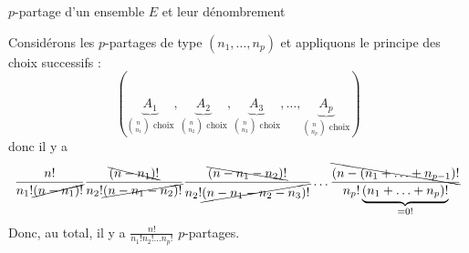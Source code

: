 \documentclass{article}
\renewenvironment{question_kholle}[2][ ]
{
	\subsection{\texorpdfstring{#2}{}}
	\notblank{#1}
	{
		\noindent #1
		\bigbreak
	}
	{}
	\begin{proof}
}
{
	\end{proof}
}
\begin{document}
\begin{question_kholle}
  [Soit $p \in \N^*$. Un $p$-partage de $E$ est un $p$-liste $(A_1, \ldots, A_p) \in \mathcal{P}(E)^p$ de parties de $E$ (éventuellement vide), deux à deux disjointes qui recouvrent $E$ c'est-à-dire \tq+* t:
    \begin{equation}
      \forall (i, j) \in \lient 1 ; p \rient,
      i \neq j \implies A_i \cap A_j = \emptyset
      \qquad \text{et} \qquad
      \bigcup_{i=1}^{p} A_i = E
    \end{equation}

    Soient $(n_1, \ldots n_p) \in \N^p$ \tqs $n = n_1 + \ldots + n_p$ est un $p$-partage de $E$ \tq
    \begin{equation*}
      \forall (i, j) \in \lient 1 ; p \rient, \
      \left|A_i\right| = n_i
    \end{equation*}
    Le nombre de $p$-partage de type $(n_1, \ldots, n_p)$ est :
    \begin{equation}
      \frac{n!}{\displaystyle \prod_{i=1}^{p} n_i !}
    \end{equation}
  ]
  {$p$-partage d'un ensemble $E$ et leur dénombrement}

  Considérons les $p$-partages de type $(n_1, \ldots, n_p)$ et appliquons le principe des choix successifs :
  \begin{equation*}
    \left(
    \underbrace{A_1}_{\binom{n}{n_1} \text{ choix}},
    \underbrace{A_2}_{\binom{n}{n_2} \text{ choix}},
    \underbrace{A_3}_{\binom{n}{n_3} \text{ choix}},
    \ldots,
    \underbrace{A_p}_{\binom{n}{n_p} \text{ choix}}
    \right)
  \end{equation*}
  donc il y a
  \begin{equation*}
    \frac{ n! }{n_1! \cancel{(n-n_1)!} }
    \frac{ \bcancel{(n-n_1)!} }{n_2! \cancel{(n-n_1-n_2)!} }
    \frac{ \bcancel{(n-n_1-n_2)!} }{n_2! \cancel{(n-n_1-n_2-n_3)!} }
    \ldots
    \frac{ \bcancel{(n-(n_1+\ldots+n_{p-1})!} }{n_p! \underbrace{(n_1+\ldots+n_p)!}_{=0!} }
  \end{equation*}
  Donc, au total, il y a $\frac{n!}{n_1! n_2! \ldots n_p!}$ $p$-partages.
\end{question_kholle}
\end{document}
